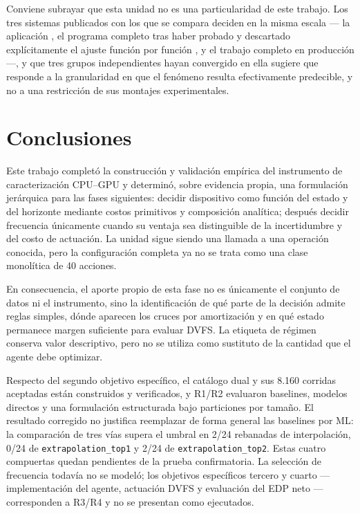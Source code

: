 \documentclass[12pt,oneside,spanish]{book}
\begin{document}
Conviene subrayar que esta unidad no es una particularidad de este trabajo. Los tres sistemas publicados con los que se compara deciden en la misma escala --- la aplicación \cite{Guerreiro2019}, el programa completo tras haber probado y descartado explícitamente el ajuste función por función \cite{Calore2017}, y el trabajo completo en producción \cite{Antici2024} ---, y que tres grupos independientes hayan convergido en ella sugiere que responde a la granularidad en que el fenómeno resulta efectivamente predecible, y no a una restricción de sus montajes experimentales.



\chapter{Conclusiones}

Este trabajo completó la construcción y validación empírica del instrumento de caracterización CPU--GPU y determinó, sobre evidencia propia, una formulación jerárquica para las fases siguientes: decidir dispositivo como función del estado y del horizonte mediante costos primitivos y composición analítica; después decidir frecuencia únicamente cuando su ventaja sea distinguible de la incertidumbre y del costo de actuación. La unidad sigue siendo una llamada a una operación conocida, pero la configuración completa ya no se trata como una clase monolítica de 40 acciones.

En consecuencia, el aporte propio de esta fase no es únicamente el conjunto de datos ni el instrumento, sino la identificación de qué parte de la decisión admite reglas simples, dónde aparecen los cruces por amortización y en qué estado permanece margen suficiente para evaluar DVFS. La etiqueta de régimen conserva valor descriptivo, pero no se utiliza como sustituto de la cantidad que el agente debe optimizar.

Respecto del segundo objetivo específico, el catálogo dual y sus 8.160 corridas aceptadas están construidos y verificados, y R1/R2 evaluaron baselines, modelos directos y una formulación estructurada bajo particiones por tamaño. El resultado corregido no justifica reemplazar de forma general las baselines por ML: la comparación de tres vías supera el umbral en 2/24 rebanadas de interpolación, 0/24 de \texttt{extrapolation\_top1} y 2/24 de \texttt{extrapolation\_top2}. Estas cuatro compuertas quedan pendientes de la prueba confirmatoria. La selección de frecuencia todavía no se modeló; los objetivos específicos tercero y cuarto --- implementación del agente, actuación DVFS y evaluación del EDP neto --- corresponden a R3/R4 y no se presentan como ejecutados.
\end{document}
